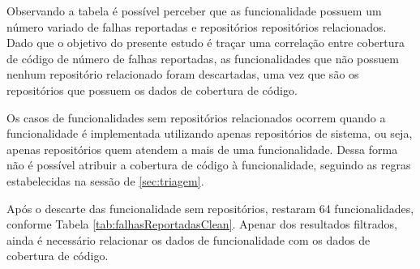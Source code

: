 \documentclass[11.5pt]{article}
\begin{document}

Observando a tabela é possível perceber que as funcionalidade possuem um número variado de falhas
reportadas e repositórios repositórios relacionados.
Dado que o objetivo do presente estudo é traçar uma correlação entre cobertura de código de número
de falhas reportadas, as funcionalidades que não possuem nenhum repositório relacionado foram
descartadas, uma vez que são os repositórios que possuem os dados de cobertura de código.

Os casos de funcionalidades sem repositórios relacionados ocorrem quando a funcionalidade é
implementada utilizando apenas repositórios de sistema, ou seja, apenas repositórios quem atendem a
mais de uma funcionalidade.
Dessa forma não é possível atribuir a cobertura de código à funcionalidade, seguindo as regras
estabelecidas na sessão de \ref{sec:triagem}.

Após o descarte das funcionalidade sem repositórios, restaram 64 funcionalidades, conforme
Tabela \ref{tab:falhasReportadasClean}.
Apenar dos resultados filtrados, ainda é necessário relacionar os dados de funcionalidade com os
dados de cobertura de código.
\end{document}
